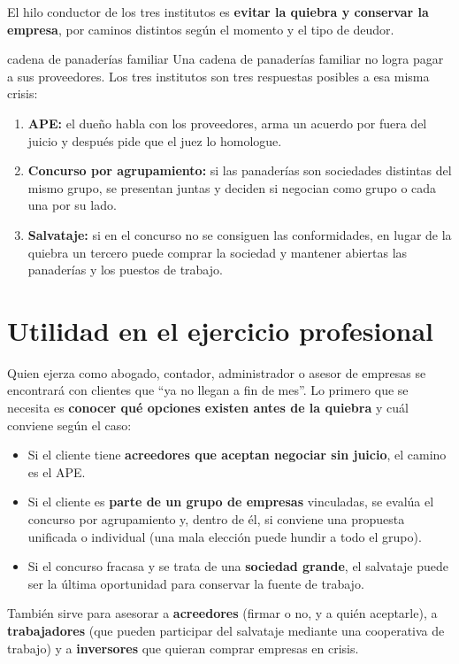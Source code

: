 \documentclass[12pt,oneside]{book}
\begin{document}
El hilo conductor de los tres institutos es \textbf{evitar la quiebra y conservar la empresa}, por caminos distintos según el momento y el tipo de deudor.

\begin{example}{cadena de panaderías familiar}
Una cadena de panaderías familiar no logra pagar a sus proveedores. Los tres institutos son tres respuestas posibles a esa misma crisis:
\begin{enumerate}
    \item \textbf{APE:} el dueño habla con los proveedores, arma un acuerdo por fuera del juicio y después pide que el juez lo homologue.
    \item \textbf{Concurso por agrupamiento:} si las panaderías son sociedades distintas del mismo grupo, se presentan juntas y deciden si negocian como grupo o cada una por su lado.
    \item \textbf{Salvataje:} si en el concurso no se consiguen las conformidades, en lugar de la quiebra un tercero puede comprar la sociedad y mantener abiertas las panaderías y los puestos de trabajo.
\end{enumerate}
\end{example}

\section{Utilidad en el ejercicio profesional}

Quien ejerza como abogado, contador, administrador o asesor de empresas se encontrará con clientes que ``ya no llegan a fin de mes''. Lo primero que se necesita es \textbf{conocer qué opciones existen antes de la quiebra} y cuál conviene según el caso:

\begin{itemize}
    \item Si el cliente tiene \textbf{acreedores que aceptan negociar sin juicio}, el camino es el APE.
    \item Si el cliente es \textbf{parte de un grupo de empresas} vinculadas, se evalúa el concurso por agrupamiento y, dentro de él, si conviene una propuesta unificada o individual (una mala elección puede hundir a todo el grupo).
    \item Si el concurso fracasa y se trata de una \textbf{sociedad grande}, el salvataje puede ser la última oportunidad para conservar la fuente de trabajo.
\end{itemize}

También sirve para asesorar a \textbf{acreedores} (firmar o no, y a quién aceptarle), a \textbf{trabajadores} (que pueden participar del salvataje mediante una cooperativa de trabajo) y a \textbf{inversores} que quieran comprar empresas en crisis.
\end{document}
